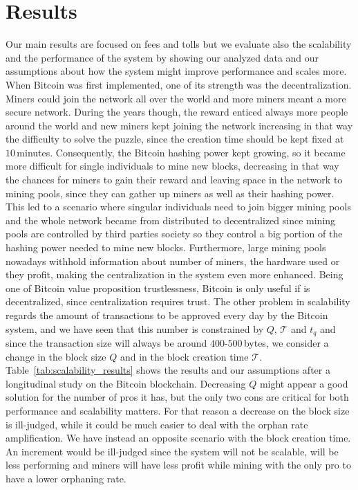 \documentclass[USenglish]{uit-thesis}
\begin{document}
\section{Results}
\label{sec:results}
Our main results are focused on fees and tolls
but we evaluate also the scalability and the
performance of the system by showing
our analyzed data and our assumptions about
how the system might improve performance
and scales more.
When Bitcoin was first implemented, one of its strength was
the decentralization. Miners could join the network all
over the world and more miners meant a more secure
network. During the years though, the reward enticed
always more people around the world and new miners
kept joining the network increasing in that way the
difficulty to solve the puzzle, since the creation time
should be kept fixed at $10$\,minutes. Consequently,
the Bitcoin hashing power kept growing, so
it became more difficult for single individuals to
mine new blocks, decreasing in that way the
chances for miners to gain their reward and leaving
space in the network to mining pools, since
they can gather up miners as well
as their hashing power.
This led to a scenario where singular
individuals need to join bigger mining
pools and the whole network became
from distributed to decentralized since
mining pools are controlled by third parties
society so they control a big portion
of the hashing power needed to mine new blocks.
Furthermore, large mining pools nowadays
withhold information about number of miners,
the hardware used or they profit,
making the centralization in the system
even more enhanced. Being one of Bitcoin
value proposition trustlessness, Bitcoin is only useful
if is decentralized, since centralization requires trust.
The other problem in scalability regards the amount
of transactions to be approved every day by the
Bitcoin system, and we have seen that
this number is constrained by
$Q$, $\mathcal{T}$ and $t_q$ and
since the transaction size will always be
around $400$-$500$\,bytes, we consider
a change in the block size $Q$ and
in the block creation time $\mathcal{T}$.
Table~\ref{tab:scalability_results} shows
the results and our assumptions after a
longitudinal study on the Bitcoin
blockchain. Decreasing $Q$ might
appear a good solution for the number
of pros it has,
but the only two cons are critical
for both performance and
scalability matters. For that reason
a decrease on the block size is ill-judged,
while it could be much easier to deal
with the orphan rate amplification.
We have instead an opposite scenario
with the block creation time. An increment
would be ill-judged since the system will
not be scalable, will be less performing and
miners will have less profit while mining
with the only pro to have a lower
orphaning rate.
\end{document}
